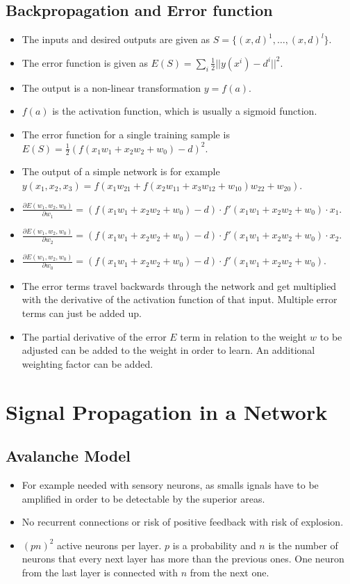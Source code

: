 \documentclass[a4paper, 12pt]{article}
\begin{document}
\subsection{Backpropagation and Error function}
\begin{itemize}[noitemsep,nolistsep]
	\item The inputs and desired outputs are given as $S=\{(x,d)^1,\ldots,(x,d)^l\}$.
	\item The error function is given as $E(S) = \sum_i\frac{1}{2}||y(x^i)-d^i||^2$.
	\item The output is a non-linear transformation $y=f(a)$.
	\item $f(a)$ is the activation function, which is usually a sigmoid function.
	\item The error function for a single training sample is $E(S)=\frac{1}{2}(f(x_1w_1+x_2w_2+w_0)-d)^2$.
	\item The output of a simple network is for example $y(x_1,x_2,x_3)=f(x_1w_{21}+f(x_2w_{11}+x_3w_{12}+w_{10})w_{22}+w_{20})$.
	\item $\frac{\partial E(w_1,w_2,w_0)}{\partial w_1}=(f(x_1w_1+x_2w_2+w_0)-d)\cdot f'(x_1w_1+x_2w_2+w_0)\cdot x_1$.
	\item $\frac{\partial E(w_1,w_2,w_0)}{\partial w_2}=(f(x_1w_1+x_2w_2+w_0)-d)\cdot f'(x_1w_1+x_2w_2+w_0)\cdot x_2$.
	\item $\frac{\partial E(w_1,w_2,w_0)}{\partial w_0}=(f(x_1w_1+x_2w_2+w_0)-d)\cdot f'(x_1w_1+x_2w_2+w_0)$.
	\item The error terms travel backwards through the network and get multiplied with the derivative of the activation function of that input. Multiple error terms can just be added up.
	\item The partial derivative of the error $E$ term in relation to the weight $w$ to be adjusted can be added to the weight in order to learn. An additional weighting factor can be added.
\end{itemize}

\section{Signal Propagation in a Network}
\subsection{Avalanche Model}
\begin{itemize}[noitemsep,nolistsep]
	\item For example needed with sensory neurons, as smalls ignals have to be amplified in order to be detectable by the superior areas.
	\item No recurrent connections or risk of positive feedback with risk of explosion.
	\item $(pn)^2$ active neurons per layer. $p$ is a probability and $n$ is the number of neurons that every next layer has more than the previous ones. One neuron from the last layer is connected with $n$ from the next one.
\end{itemize}
\end{document}
